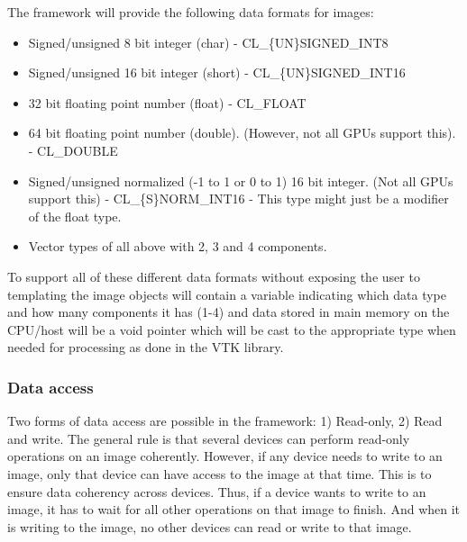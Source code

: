 \documentclass{article}
\begin{document}
The framework will provide the following data formats for images:
\begin{itemize}
    \itemsep 1pt
    \item Signed/unsigned 8 bit integer (char) - CL\_\{UN\}SIGNED\_INT8
    \item Signed/unsigned 16 bit integer (short) - CL\_\{UN\}SIGNED\_INT16
    \item 32 bit floating point number (float) - CL\_FLOAT
    \item 64 bit floating point number (double). (However, not all GPUs support this). - CL\_DOUBLE
    \item Signed/unsigned normalized (-1 to 1 or 0 to 1) 16 bit integer. (Not all GPUs support this) - CL\_\{S\}NORM\_INT16 - This type might just be a modifier of the float type.
    \item Vector types of all above with 2, 3 and 4 components. 
\end{itemize}

To support all of these different data formats without exposing the user to templating the image objects will contain a variable indicating which data type and how many components it has (1-4) and data stored in main memory on the CPU/host will be a void pointer which will be cast to the appropriate type when needed for processing as done in the VTK library.

\subsubsection{Data access}

Two forms of data access are possible in the framework: 1) Read-only, 2) Read and write.
The general rule is that several devices can perform read-only operations on an image coherently.
However, if any device needs to write to an image, only that device can have access to the image at that time.
This is to ensure data coherency across devices.
Thus, if a device wants to write to an image, it has to wait for all other operations on that image to finish.
And when it is writing to the image, no other devices can read or write to that image.
\end{document}
